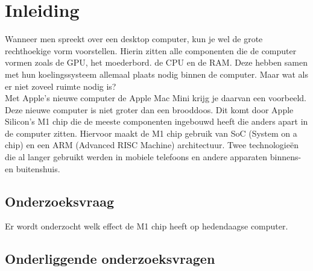 \documentclass{hogent-article}
\affiliation{
    \textsuperscript{1} \href{mailto:jona.deneve.@student.hogent.be}{jona.deneve.@student.hogent.be}
}
\begin{document}
\flushbottom %
\maketitle %
    \tableofcontents %
\thispagestyle{empty} %


\section{Inleiding}


Wanneer men spreekt over een desktop computer, kun je wel de grote rechthoekige vorm voorstellen. Hierin zitten alle componenten die de computer vormen zoals de GPU, het moederbord. de CPU en de RAM. Deze hebben samen met hun koelingssysteem allemaal plaats nodig binnen de computer. Maar wat als er niet zoveel ruimte nodig is? \\
Met Apple's nieuwe computer de Apple Mac Mini krijg je daarvan een voorbeeld. Deze nieuwe computer is niet groter dan een brooddoos. Dit komt door Apple Silicon's M1 chip die de meeste componenten ingebouwd heeft die anders apart in de computer zitten. Hiervoor maakt de M1 chip gebruik van SoC (System on a chip) en een ARM (Advanced RISC Machine) architectuur. Twee technologieën die al langer gebruikt werden in mobiele telefoons en andere apparaten binnens- en buitenshuis.

\subsection{Onderzoeksvraag}

Er wordt onderzocht welk effect de M1 chip heeft op hedendaagse computer.

\subsection{Onderliggende onderzoeksvragen}
\end{document}
